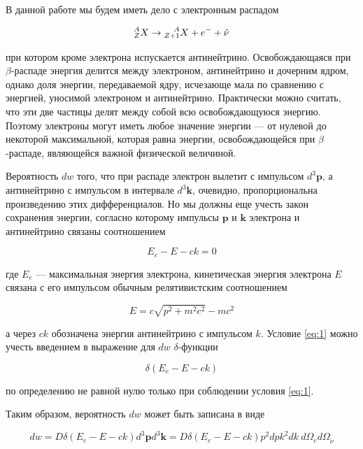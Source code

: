 \documentclass[a4paper,12pt]{article}
\begin{document}
В данной работе мы будем иметь дело с электронным распадом

\begin{equation*}
    \prescript{A}{Z}{X} \to \prescript{A}{Z+1}{X} + e^{-} + \tilde{\nu}
\end{equation*}

при котором кроме электрона испускается антинейтрино. Освобождающаяся при $\beta$-распаде энергия делится между электроном, антинейтрино и дочерним ядром, однако доля энергии, передаваемой ядру, исчезающе мала по сравнению с энергией, уносимой электроном и антинейтрино. Практически можно считать, что эти две частицы делят между собой всю освобождающуюся энергию. Поэтому электроны могут иметь любое значение энергии — от нулевой до некоторой максимальной, которая равна энергии, освобождающейся при $\beta$-распаде, являющейся важной физической величиной.

Вероятность $d w$ того, что при распаде электрон вылетит с импульсом $d^3 \mathbf{p}$, а антинейтрино с импульсом в интервале $d^3 \mathbf{k}$, очевидно, пропорциональна произведению этих дифференциалов. Но мы должны еще учесть закон сохранения энергии, согласно которому импульсы $\mathbf{p}$ и $\mathbf{k}$ электрона и антинейтрино связаны соотношением

\begin{equation}\label{eq:1}
    E_e - E - ck = 0
\end{equation}


где $E_e$ — максимальная энергия электрона, кинетическая энергия электрона $E$ связана с его импульсом обычным релятивистским соотношением

\begin{equation}\label{eq:2}
    E = c \sqrt{p^2 + m^2 c^2} - mc^2
\end{equation}


а через $ck$ обозначена энергия антинейтрино с импульсом $k$. Условие \eqref{eq:1} можно учесть введением в выражение для $dw$ $\delta$-функции

\begin{equation}\label{eq:3}
    \delta \left( E_e - E - ck \right)
\end{equation}

по определению не равной нулю только при соблюдении условия \eqref{eq:1}.

Таким образом, вероятность $dw$ может быть записана в виде

\begin{equation}\label{eq:4}
    dw = D \delta \left( E_e - E - ck \right) d^3 \mathbf{p} d^3 \mathbf{k} = D \delta \left( E_e - E - ck \right) p^2 dp k^2 dk \ d\Omega_e d \Omega_{\tilde{\nu}}
\end{equation}
\end{document}
